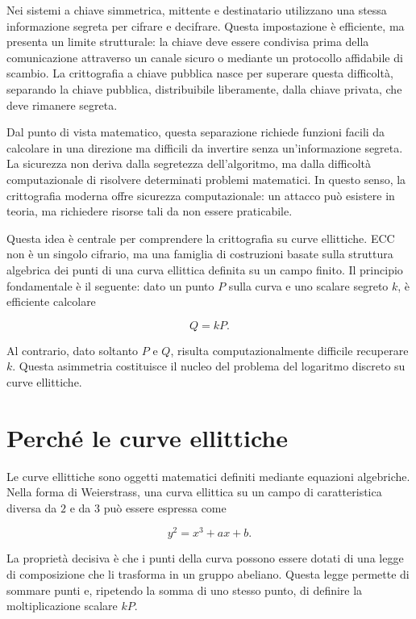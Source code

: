 \documentclass[12pt,a4paper,oneside]{report}
\begin{document}
Nei sistemi a chiave simmetrica, mittente e destinatario utilizzano una stessa informazione segreta per cifrare e decifrare. Questa impostazione è efficiente, ma presenta un limite strutturale: la chiave deve essere condivisa prima della comunicazione attraverso un canale sicuro o mediante un protocollo affidabile di scambio. La crittografia a chiave pubblica nasce per superare questa difficoltà, separando la chiave pubblica, distribuibile liberamente, dalla chiave privata, che deve rimanere segreta.

Dal punto di vista matematico, questa separazione richiede funzioni facili da calcolare in una direzione ma difficili da invertire senza un'informazione segreta. La sicurezza non deriva dalla segretezza dell'algoritmo, ma dalla difficoltà computazionale di risolvere determinati problemi matematici. In questo senso, la crittografia moderna offre sicurezza computazionale: un attacco può esistere in teoria, ma richiedere risorse tali da non essere praticabile.

Questa idea è centrale per comprendere la crittografia su curve ellittiche. ECC non è un singolo cifrario, ma una famiglia di costruzioni basate sulla struttura algebrica dei punti di una curva ellittica definita su un campo finito. Il principio fondamentale è il seguente: dato un punto \(P\) sulla curva e uno scalare segreto \(k\), è efficiente calcolare

\[
Q=kP.
\]

Al contrario, dato soltanto \(P\) e \(Q\), risulta computazionalmente difficile recuperare \(k\). Questa asimmetria costituisce il nucleo del problema del logaritmo discreto su curve ellittiche.

\section{Perché le curve ellittiche}

Le curve ellittiche sono oggetti matematici definiti mediante equazioni algebriche. Nella forma di Weierstrass, una curva ellittica su un campo di caratteristica diversa da \(2\) e da \(3\) può essere espressa come

\begin{equation}
    y^2 = x^3 + ax + b.
\end{equation}

La proprietà decisiva è che i punti della curva possono essere dotati di una legge di composizione che li trasforma in un gruppo abeliano. Questa legge permette di sommare punti e, ripetendo la somma di uno stesso punto, di definire la moltiplicazione scalare \(kP\).
\end{document}
